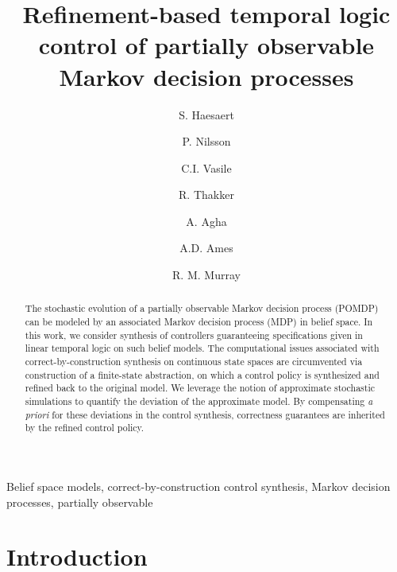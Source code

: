 \documentclass{ifacconf}
\begin{document}
\begin{frontmatter}

\title{\huge Refinement-based temporal logic control of partially observable Markov decision processes }

\author[cal]{S. Haesaert}
\author[cal]{P. Nilsson}
\author[mit]{C.I. Vasile}
\author[jpl]{R. Thakker}
\author[jpl]{A. Agha}
\author[cal]{A.D.  Ames}
\author[cal]{R. M. Murray}



\address[cal]{California Institute of Technology,
   Pasadena, CA 91125 USA} %
\address[mit]{Massachusetts Institute of Technology,
   Cambridge, MA 02139 USA}%
\address[jpl]{Jet Propulsion Laboratory,
   Pasadena, CA 91109 USA}%
\maketitle
\begin{abstract}
The stochastic evolution of a partially observable Markov decision process (POMDP) can be modeled by an associated Markov decision process (MDP) in belief space.
In this work, we consider synthesis of controllers guaranteeing  specifications given in linear temporal logic on such belief models. The computational issues associated with correct-by-construction synthesis on continuous state spaces are circumvented via construction of a finite-state abstraction, on which a control policy is synthesized and refined back to the original model. We leverage the notion of approximate stochastic simulations to quantify the deviation of the approximate model. By compensating {\it a priori} for these deviations in the control synthesis, correctness guarantees are inherited by the refined control policy.
\end{abstract}
\begin{keyword} Belief space models,
correct-by-construction control synthesis, Markov decision processes, partially observable
\end{keyword}

\end{frontmatter}

\section{Introduction}
\label{subsec:intro}
\end{document}
